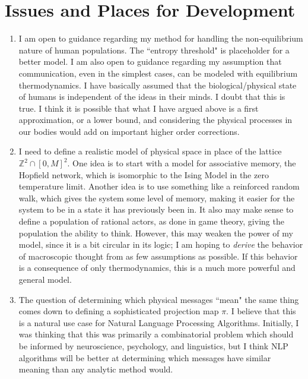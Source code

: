 \documentclass{article}
\begin{document}
\section{Issues and Places for Development}
\begin{enumerate}
    \item I am open to guidance regarding my method for handling the non-equilibrium nature of human populations. The ``entropy threshold" is placeholder for a better model. I am also open to guidance regarding my assumption that communication, even in the simplest cases, can be modeled with equilibrium thermodynamics. I have basically assumed that the biological/physical state of humans is independent of the ideas in their minds. I doubt that this is true. I think it is possible that what I have argued above is a first approximation, or a lower bound, and considering the physical processes in our bodies would add on important higher order corrections.
    \item I need to define a realistic model of physical space in place of the lattice $\mathbb{Z}^2\cap[0,M]^2$. One idea is to start with a model for associative memory, the Hopfield network, which is isomorphic to the Ising Model in the zero temperature limit. Another idea is to use something like a reinforced random walk, which gives the system some level of memory, making it easier for the system to be in a state it has previously been in. It also may make sense to define a population of rational actors, as done in game theory, giving the population the ability to think. However, this may weaken the power of my model, since it is a bit circular in its logic; I am hoping to \emph{derive} the behavior of  macroscopic thought from as few assumptions as possible. If this behavior is a consequence of only thermodynamics, this is a much more powerful and general model.
    \item The question of determining which physical messages ``mean" the same thing comes down to defining a sophisticated projection map $\pi$. I believe that this is a natural use case for Natural Language Processing Algorithms. Initially, I was thinking that this was primarily a combinatorial problem which should be informed by neuroscience, psychology, and linguistics, but I think NLP algorithms will be better at determining which messages have similar meaning than any analytic method would.

\end{enumerate}
\end{document}
